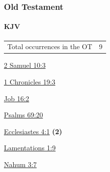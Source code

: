 	\subsubsection{Old Testament} %
		\label{COMFORTER-OT}
	
		\paragraph{KJV}
			\label{COMFORTER-OT-KJV}
	
			\begin{tabular}{ll}
				Total occurrences in the OT & 9
			\end{tabular}
			
			\begin{compactdesc}
				\item[{\hyperref[2SAMUEL-10-3]{2 Samuel 10:3}}]
				\item[{\hyperref[1CHRONICLES-19-3]{1 Chronicles 19:3}}]
				\item[{\hyperref[JOB-16-2]{Job 16:2}}]
				\item[{\hyperref[PSALMS-69-20]{Psalms 69:20}}]
				\item[{\hyperref[ECCLESIASTES-4-1]{Ecclesiastes 4:1}}] \textbf{(2)}
				\item[{\hyperref[LAMENTATIONS-1-9]{Lamentations 1:9}}]
				\item[{\hyperref[NAHUM-3-7]{Nahum 3:7}}]
			\end{compactdesc}
			
		
			
				
